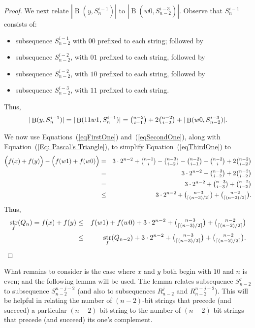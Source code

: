 \documentclass[12pt]{article}
\DeclareMathOperator{\str}{str}
\DeclareMathOperator{\Prec}{B}
\begin{document}
\begin{proof}
We next relate $|\Prec(y,S_{n}^{i-1})|$ to $|\Prec(w0,S_{n-2}^{i-3})|$.  
 Observe that $S_{n}^{i-1}$ consists of:
\begin{itemize} 
\item subsequence $S_{n-2}^{i-1}$ with $00$ prefixed to each string; followed by \vspace{-0.09in}
\item subsequence $S_{n-2}^{i-2}$, with $01$ prefixed to each string, followed by\vspace{-0.09in}
\item subsequence $S_{n-2}^{i-2}$, with $10$ prefixed to each string, followed by\vspace{-0.09in} 
\item subsequence $S_{n-2}^{i-3}$, with $11$ prefixed to each string.\end{itemize} Thus, \begin{equation}\label{eqSecondOne} |\Prec(y,S_{n}^{i-1})| = |\Prec(11w1,S_{n}^{i-1})|= \tbinom{n-2}{i-1}+ 2\tbinom{n-2}{i-2}+|\Prec(w0,S_{n-2}^{i-3})|.\end{equation}



We now use Equations~(\ref{eqFirstOne}) and~(\ref{eqSecondOne}), along with Equation~(\ref{Eq: Pascal's Triangle}), to simplify Equation~(\ref{eqThirdOne}) to \begin{eqnarray*}\Big(f(x)+f(y)\Big) - \Big(f(w1)+f(w0)\Big) &=& 3 \cdot 2^{n-2} + \tbinom{n-1}{i}-\tbinom{n-3}{i-2} -\tbinom{n-2}{i-1}-\tbinom{n-2}{i}+2\tbinom{n-2}{i-2} \\ &=& 3 \cdot 2^{n-2} - \tbinom{n-3}{i-2}+2\tbinom{n-2}{i-2} \\ &=& 3 \cdot 2^{n-2} + \tbinom{n-3}{i-3}+\tbinom{n-2}{i-2}  \\ & \leq& 3 \cdot 2^{n-2} + \tbinom{n-3}{\lceil (n-3)/2\rceil}+\tbinom{n-2}{\lceil (n-2)/2 \rceil}.\end{eqnarray*} Thus, \begin{eqnarray*}\str_f(Q_{n}) = f(x)+f(y) &\leq& f(w1)+f(w0) + 3\cdot 2^{n-2}+ \tbinom{n-3}{\lceil (n-3)/2\rceil}+\tbinom{n-2}{\lceil (n-2)/2\rceil } \\ &\leq& \str_f(Q_{n-2})+ 3\cdot 2^{n-2}+ \tbinom{n-3}{\lceil (n-3)/2\rceil}+\tbinom{n-2}{\lceil (n-2)/2\rceil }.\end{eqnarray*}\end{proof}

What remains to consider is the case where $x$ and $y$ both begin with $10$ and $n$ is even; and the following lemma will be used. The lemma relates subsequence $S_{n-2}^j$ to subsequence $S_{n-2}^{n-j-2}$ (and also to subsequences $R_{n-2}^j$ and $R_{n-2}^{n-j-2}$).  This will be helpful in relating the number of $(n-2)$-bit strings that precede (and succeed) a particular $(n-2)$-bit string to the number of $(n-2)$-bit strings that precede (and succeed) its one's complement.
\end{document}
